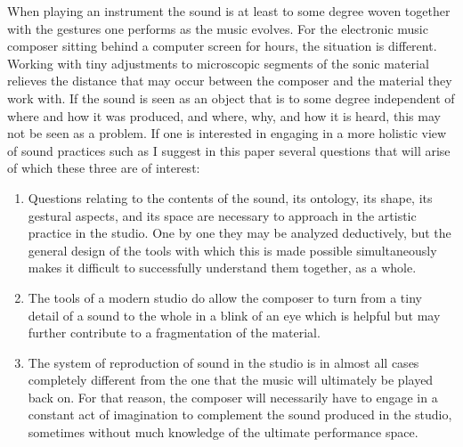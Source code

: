 \documentclass[11pt]{article}
\begin{document}
When playing an instrument the sound is at least to some degree woven together with the gestures one performs as the music evolves.
For the electronic music composer sitting behind a computer screen for hours, the situation is different.
Working with tiny adjustments to microscopic segments of the sonic material relieves the distance that may occur between the composer and the material they work with.
If the sound is seen as an object that is to some degree independent of where and how it was produced, and where, why, and how it is heard, this may not be seen as a problem.
If one is interested in engaging in a more holistic view of sound practices such as I suggest in this paper several questions that will arise of which these three are of interest:

\begin{enumerate}
\item Questions relating to the contents of the sound, its ontology, its shape, its gestural aspects, and its space are necessary to approach in the artistic practice in the studio. One by one they may be analyzed deductively, but the general design of the tools with which this is made possible simultaneously makes it difficult to successfully understand them together, as a whole.
\item The tools of a modern studio do allow the composer to turn from a tiny detail of a sound to the whole in a blink of an eye which is helpful but may further contribute to a fragmentation of the material.
\item The system of reproduction of sound in the studio is in almost all cases completely different from the one that the music will ultimately be played back on.  For that reason, the composer will necessarily have to engage in a constant act of imagination to complement the sound produced in the studio, sometimes without much knowledge of the ultimate performance space.
\end{enumerate}
\end{document}
